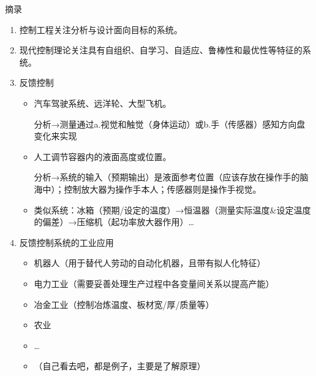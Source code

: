 \documentclass[oneside,a4paper]{ctexbook}
\begin{document}
摘录
\begin{enumerate}
    \item 控制工程关注分析与设计面向目标的系统。
    \item 现代控制理论关注具有自组织、自学习、自适应、鲁棒性和最优性等特征的系统。
    \item 反馈控制
    \begin{itemize}
        \item 汽车驾驶系统、远洋轮、大型飞机。
        
        分析→测量通过a.视觉和触觉（身体运动）或b.手（传感器）感知方向盘变化来实现

        \item 人工调节容器内的液面高度或位置。
        
        分析→系统的输入（预期输出）是液面参考位置（应该存放在操作手的脑海中）；控制放大器为操作手本人；传感器则是操作手视觉。

        \item 类似系统：冰箱（预期/设定的温度）→恒温器（测量实际温度\&设定温度的偏差）→压缩机（起功率放大器作用）\ldots
    \end{itemize}
    \item 反馈控制系统的工业应用
    \begin{itemize}
        \item 机器人（用于替代人劳动的自动化机器，且带有拟人化特征）
        \item 电力工业（需要妥善处理生产过程中各变量间关系以提高产能）
        \item 冶金工业（控制冶炼温度、板材宽/厚/质量等）
        \item 农业
        \item \ldots
        \item （自己看去吧，都是例子，主要是了解原理）
    \end{itemize}
\end{enumerate}
\end{document}

